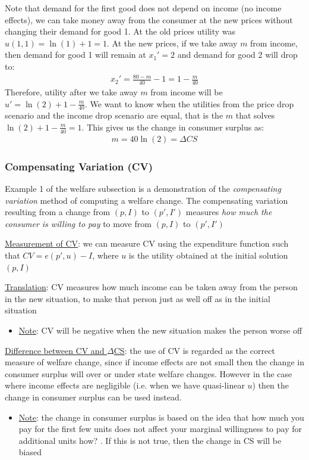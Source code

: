 \documentclass{article}
\begin{document}
\begin{itemize}
    Note that demand for the first good does not depend on income (no income effects), we can take money away from the consumer at the new prices without changing their demand for good 1. At the old prices utility was $u(1,1) = \ln(1) + 1 = 1$. At the new prices, if we take away $m$ from income, then demand for good 1 will remain at $x_{1}' = 2$ and demand for good 2 will drop to:
    \begin{gather*}
      x_{2}' = \frac{80 - m}{40} - 1 = 1 - \frac{m}{40}
    \end{gather*}
    Therefore, utility after we take away $m$ from income will be $u' = \ln(2) + 1 - \tfrac{m}{40}$. We want to know when the utilities from the price drop scenario and the income drop scenario are equal, that is the $m$ that solves $\ln(2) + 1 - \tfrac{m}{40} = 1$. This gives us the change in consumer surplus as:
    \begin{gather*}
      m = 40 \ln(2) = \Delta CS
    \end{gather*}
  \end{itemize}
  \par
\vspace{6mm}
\subsubsection{Compensating Variation (CV)}
Example 1 of the welfare subsection is a demonstration of the \textit{compensating variation} method of computing a welfare change. The compensating variation resulting from a change from $(p, I)$ to $(p', I')$ measures \textit{how much the consumer is willing to pay} to move from $(p, I)$ to $(p', I')$ \par \vspace{0.3em}
  \underline{Measurement of CV}: we can measure CV using the expenditure function such that $CV = e(p', u) - I$, where $u$ is the utility obtained at the initial solution $(p, I)$
  \par
  \underline{Translation}: CV measures how much income can be taken away from the person in the new situation, to make that person just as well off as in the initial situation
  \begin{itemize}
    \item  \underline{Note}: CV will be negative when the new situation makes the person worse off
  \end{itemize}
  \par
  \underline{Difference between CV and $\Delta$CS}: the use of CV is regarded as the correct measure of welfare change, since if income effects are not small then the change in consumer surplus will over or under state welfare changes. However in the case where income effects are negligible (i.e. when we have quasi-linear $u$) then the change in consumer surplus can be used instead.
  \begin{itemize}
    \item  \underline{Note}: the change in consumer surplus is based on the idea that how much you pay for the first few units does not affect your marginal willingness to pay for additional units \begingroup\color{magenta} how? \endgroup. If this is not true, then the change in CS will be biased
  \end{itemize}
\end{document}
